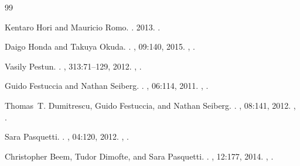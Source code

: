 \documentclass[11pt,a4paper]{article}
\numberwithin{equation}{section}
\theoremstyle{plain}
\theoremstyle{definition}
\theoremstyle{remark}
\begin{document}
%
%

\begin{thebibliography}{99}

Kentaro Hori and Mauricio Romo.
.
 2013.
\newblock \href {https://arxiv.org/abs/1308.2438} {}.

Daigo Honda and Takuya Okuda.
.
, 09:140, 2015.
\newblock \href {https://arxiv.org/abs/1308.2217} {},
  \href {https://doi.org/10.1007/JHEP09(2015)140}
  {}.

Vasily Pestun.
.
, 313:71--129, 2012.
\newblock \href {https://arxiv.org/abs/0712.2824} {},
  \href {https://doi.org/10.1007/s00220-012-1485-0}
  {}.

Guido Festuccia and Nathan Seiberg.
.
, 06:114, 2011.
\newblock \href {https://arxiv.org/abs/1105.0689} {},
  \href {https://doi.org/10.1007/JHEP06(2011)114}
  {}.

Thomas~T. Dumitrescu, Guido Festuccia, and Nathan Seiberg.
.
, 08:141, 2012.
\newblock \href {https://arxiv.org/abs/1205.1115} {},
  \href {https://doi.org/10.1007/JHEP08(2012)141}
  {}.

Sara Pasquetti.
.
, 04:120, 2012.
\newblock \href {https://arxiv.org/abs/1111.6905} {},
  \href {https://doi.org/10.1007/JHEP04(2012)120}
  {}.

Christopher Beem, Tudor Dimofte, and Sara Pasquetti.
.
, 12:177, 2014.
\newblock \href {https://arxiv.org/abs/1211.1986} {},
  \href {https://doi.org/10.1007/JHEP12(2014)177}
  {}.


\end{thebibliography}
\end{document}
